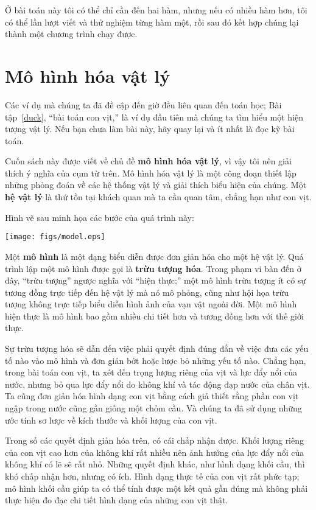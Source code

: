 \documentclass[12pt]{book}
\begin{document}
Ở bài toán này tôi có thể chỉ cần đến hai hàm, nhưng nếu có nhiều hàm hơn,
tôi có thể lần lượt viết và thử nghiệm từng hàm một, rồi sau đó kết hợp 
chúng lại thành một chương trình chạy được.



\section{Mô hình hóa vật lý}
\label{modeling}

Các ví dụ mà chúng ta đã đề cập đến giờ đều liên quan đến toán học;
Bài tập~\ref{duck}, ``bài toán con vịt,'' là ví dụ đầu tiên mà chúng ta
tìm hiểu một hiện tượng vật lý. Nếu bạn chưa làm bài này, hãy quay lại
và ít nhất là đọc kỹ bài toán.

Cuốn sách này được viết về chủ đề {\bf mô hình hóa vật lý}, vì vậy
tôi nên giải thích ý nghĩa của cụm từ trên. Mô hình hóa vật lý là một
công đoạn thiết lập những phỏng đoán về các hệ thống vật lý và 
giải thích biểu hiện của chúng. Một {\bf hệ vật lý} là thứ tồn tại 
khách quan mà ta cần quan tâm, chẳng hạn như con vịt.

Hình vẽ sau minh họa các bước của quá trình này:

\centerline{\texttt{[image: figs/model.eps]}}

Một {\bf mô hình} là một dạng biểu diễn được đơn giản hóa cho một
hệ vật lý. Quá trình lập một mô hình được gọi là {\bf trừu tượng hóa}.
Trong phạm vi bàn đến ở đây, ``trừu tượng'' ngược nghĩa với ``hiện thực;''
một mô hình trừu tượng ít có sự tương đồng trực tiếp đến hệ vật lý mà
nó mô phỏng, cũng như hội họa trừu tượng không trực tiếp biểu diễn
hình ảnh của vạn vật ngoài đời. Một mô hình hiện thực là mô hình
bao gồm nhiều chi tiết hơn và tương đồng hơn với thế giới thực.

Sự trừu tượng hóa sẽ dẫn đến việc phải quyết định đúng đắn về việc
đưa các yếu tố nào vào mô hình và đơn giản bớt hoặc lược bỏ những
yếu tố nào. Chẳng hạn, trong bài toán con vịt, ta xét đến trọng lượng riêng
của vịt và lực đẩy nổi của nước, nhưng bỏ qua lực đẩy nổi do không khí 
và tác động đạp nước của chân vịt. Ta cũng
đơn giản hóa hình dạng con vịt bằng cách giả thiết rằng phần con vịt
ngập trong nước cũng gần giống một chỏm cầu. Và chúng ta đã sử dụng
những ước tính sơ lược về kích thước và khối lượng của con vịt.

Trong số các quyết định giản hóa trên, có cái chấp nhận được. Khối lượng riêng
của con vịt cao hơn của không khí rất nhiều nên ảnh hưởng của lực đẩy nổi
của không khí có lẽ sẽ rất nhỏ. Những quyết định khác, như hình dạng
khối cầu, thì khó chấp nhận hơn, nhưng có ích. Hình dạng thực tế
của con vịt rất phức tạp; mô hình khối cầu giúp ta có thể tính được
một kết quả gần đúng mà không phải thực hiện đo đạc chi tiết hình dạng
của những con vịt thật.
\end{document}
